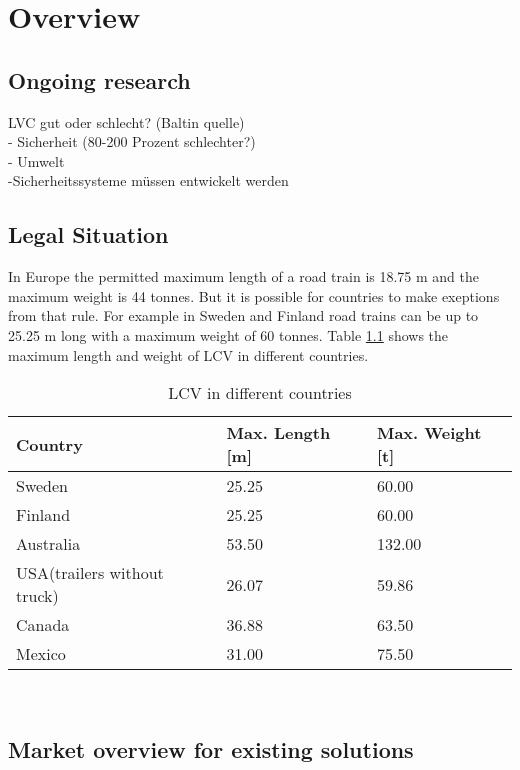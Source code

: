 \documentclass[ExampleMasters.tex]{subfiles}
\begin{document}
\clearpage
\chapter{Overview}
\label{chap:overview}
\section{Ongoing research}
LVC gut oder schlecht? (Baltin quelle) \\
- Sicherheit (80-200 Prozent schlechter?) \\
- Umwelt \\
-Sicherheitssysteme müssen entwickelt werden


\label{sec:ongoing_research}
\section{Legal Situation}
\label{sec:legal_situation}
In Europe the permitted maximum length of a road train is 18.75 m and the maximum weight is 44 tonnes. But it is possible for countries to make exeptions from that rule.\cite{96/53/EC}  For example in Sweden and Finland road trains can be up to 25.25 m long with a  maximum weight of 60 tonnes.\cite{Vaegverket}
Table \ref{tab:LCV_in_different_countries} shows the maximum length and weight of LCV in different countries.

\begin{table}[h]
	\centering
	\caption{LCV in different countries\cite{Vaegverket}\cite{LCV_Australia}\Cite{LCV_USA}\cite{LCV_Canada}\Cite{LCV_Mexico}}
	\label{tab:LCV_in_different_countries}
	\begin{tabular}{l|l|l|}
		Country   & Max. Length [m] & Max. Weight [t] \\ \hline
		Sweden    &       25.25      &       60.00      \\
		Finland   &            25.25 &         60.00    \\
		Australia &      53.50       &           132.00  \\
		USA(trailers without truck)&      26.07       &    59.86        \\
		Canada & 36.88 & 63.50 \\
		Mexico & 31.00 & 75.50 \\
	\end{tabular} \\
\end{table}
\section{Market overview for existing solutions}

\label{sec:market_overview}
\end{document}
